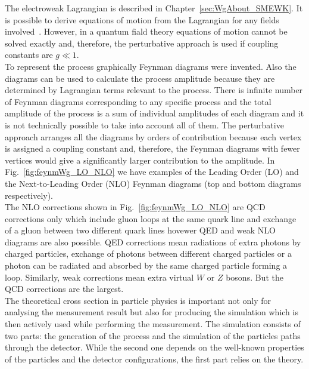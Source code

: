 The electroweak Lagrangian is described in Chapter~\ref{sec:WgAbout_SMEWK}. It is possible to derive equations of motion from the Lagrangian for any fields involved~\cite{ref_Griffiths}. However, in a quantum fiald theory equations of motion cannot be solved exactly and, therefore, the perturbative approach is used if coupling constants are $g \ll 1$.\\

To represent the process graphically Feynman diagrams were invented. Also the diagrams can be used to calculate the process amplitude because they are determined by Lagrangian terms relevant to the process. There is infinite number of Feynman diagrams corresponding to any specific process and the total amplitude of the process is a sum of individual amplitudes of each diagram and it is not technically possible to take into account all of them. The perturbative approach arranges all the diagrams by orders of contribution because each vertex is assigned a coupling constant and, therefore, the Feynman diagrams with fewer vertices would give a significantly larger contribution to the amplitude. In Fig.~\ref{fig:feynmWg_LO_NLO} we have examples of the Leading Order (LO) and the Next-to-Leading Order (NLO) Feynman diagrams (top and bottom diagrams respectively).\\

The NLO corrections shown in Fig.~\ref{fig:feynmWg_LO_NLO} are QCD corrections only which include gluon loops at the same quark line and exchange of a gluon between two different quark lines hovewer QED and weak NLO diagrams are also possible. QED corrections mean radiations of extra photons by charged particles, exchange of photons between different charged particles or a photon can be radiated and absorbed by the same charged particle forming a loop. Similarly, weak corrections mean extra virtual $W$ or $Z$ bosons. But the QCD corrections are the largest.\\

The theoretical cross section in particle physics is important not only for analysing the measurement result but also for producing the simulation which is then actively used while performing the measurement. The simulation consists of two parts: the generation of the process and the simulation of the particles paths through the detector. While the second one depends on the well-known properties of the particles and the detector configurations, the first part relies on the theory.\\

